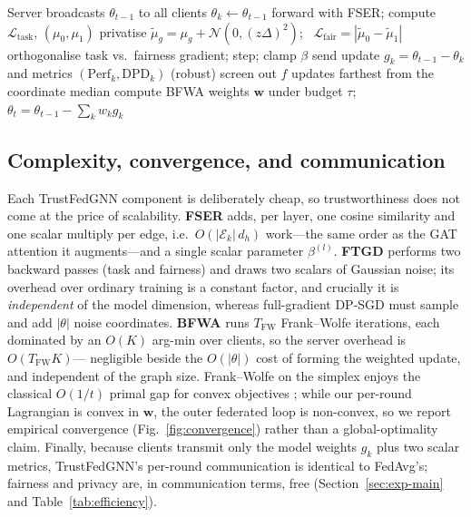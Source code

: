 \documentclass[pdflatex,sn-mathphys-num]{sn-jnl}
\theoremstyle{thmstyleone}%
\theoremstyle{thmstyletwo}%
\theoremstyle{thmstylethree}%
\newcommand{\dpd}{\mathrm{DPD}}
\begin{document}
\begin{algorithm}[t]
\caption{TrustFedGNN (one communication round $t$)}
\label{alg:fedfairgnn}
\begin{algorithmic}[1]
\State Server broadcasts $\theta_{t-1}$ to all clients
  \State $\theta_k\gets\theta_{t-1}$
    \State forward with FSER; compute $\mathcal{L}_{\text{task}}$, $(\mu_0,\mu_1)$
    \State privatise $\tilde{\mu}_g=\mu_g+\mathcal{N}(0,(z\Delta)^2)$; \ $\mathcal{L}_{\text{fair}}=|\tilde{\mu}_0-\tilde{\mu}_1|$
    \State orthogonalise task vs.\ fairness gradient; step; clamp $\beta$
  \EndFor
  \State send update $g_k=\theta_{t-1}-\theta_k$ and metrics $(\mathrm{Perf}_k,\dpd_k)$
\EndFor
\State (robust) screen out $f$ updates farthest from the coordinate median
\State compute BFWA weights $\mathbf{w}$ under budget $\tau$; \ $\theta_t=\theta_{t-1}-\sum_k w_k g_k$
\end{algorithmic}
\end{algorithm}

\subsection{Complexity, convergence, and communication}
\label{sec:complexity}
Each TrustFedGNN component is deliberately cheap, so trustworthiness does not come
at the price of scalability. \textbf{FSER} adds, per layer, one cosine similarity
and one scalar multiply per edge, i.e.\ $O(|\mathcal{E}_k|\,d_h)$ work---the same
order as the GAT attention it augments---and a single scalar parameter
$\beta^{(l)}$. \textbf{FTGD} performs two backward passes (task and fairness) and
draws two scalars of Gaussian noise; its overhead over ordinary training is a
constant factor, and crucially it is \emph{independent} of the model dimension,
whereas full-gradient DP-SGD must sample and add $|\theta|$ noise coordinates.
\textbf{BFWA} runs $T_{\mathrm{FW}}$ Frank--Wolfe iterations, each dominated by an
$O(K)$ arg-min over clients, so the server overhead is $O(T_{\mathrm{FW}}K)$---
negligible beside the $O(|\theta|)$ cost of forming the weighted update, and
independent of the graph size. Frank--Wolfe on the simplex enjoys the classical
$O(1/t)$ primal gap for convex objectives \cite{jaggi2013revisiting}; while our
per-round Lagrangian is convex in $\mathbf{w}$, the outer federated loop is
non-convex, so we report empirical convergence (Fig.~\ref{fig:convergence})
rather than a global-optimality claim. Finally, because clients transmit only
the model weights $g_k$ plus two scalar metrics, TrustFedGNN's per-round
communication is identical to FedAvg's; fairness and privacy are, in
communication terms, free (Section~\ref{sec:exp-main} and
Table~\ref{tab:efficiency}).
\end{document}
